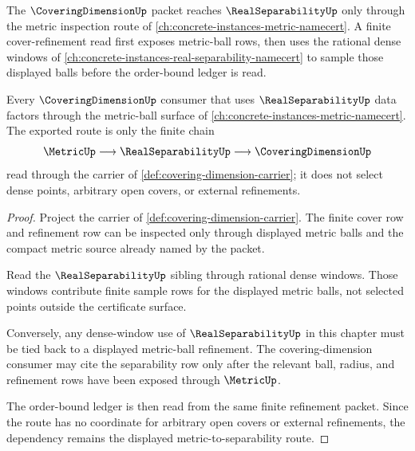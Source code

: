 The $\CoveringDimensionUp$ packet reaches $\RealSeparabilityUp$ only through the metric inspection route of \autoref{ch:concrete-instances-metric-namecert}. A finite cover-refinement read first exposes metric-ball rows, then uses the rational dense windows of \autoref{ch:concrete-instances-real-separability-namecert} to sample those displayed balls before the order-bound ledger is read.

\begin{proposition}
\label{prop:coveringdimension-metric-real-separability-route}
Every $\CoveringDimensionUp$ consumer that uses $\RealSeparabilityUp$ data factors through the metric-ball surface of \autoref{ch:concrete-instances-metric-namecert}. The exported route is only the finite chain
$$
\MetricUp \longrightarrow \RealSeparabilityUp \longrightarrow \CoveringDimensionUp
$$
read through the carrier of \autoref{def:covering-dimension-carrier}; it does not select dense points, arbitrary open covers, or external refinements.
\end{proposition}
\begin{proof}
Project the carrier of \autoref{def:covering-dimension-carrier}. The finite cover row and refinement row can be inspected only through displayed metric balls and the compact metric source already named by the packet.

Read the $\RealSeparabilityUp$ sibling through rational dense windows. Those windows contribute finite sample rows for the displayed metric balls, not selected points outside the certificate surface.

Conversely, any dense-window use of $\RealSeparabilityUp$ in this chapter must be tied back to a displayed metric-ball refinement. The covering-dimension consumer may cite the separability row only after the relevant ball, radius, and refinement rows have been exposed through $\MetricUp$.

The order-bound ledger is then read from the same finite refinement packet. Since the route has no coordinate for arbitrary open covers or external refinements, the dependency remains the displayed metric-to-separability route.
\end{proof}

